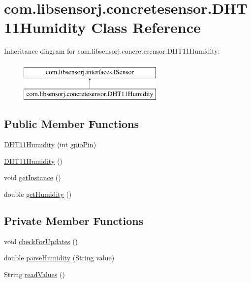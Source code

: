 \hypertarget{classcom_1_1libsensorj_1_1concretesensor_1_1DHT11Humidity}{}\section{com.\+libsensorj.\+concretesensor.\+D\+H\+T11\+Humidity Class Reference}
\label{classcom_1_1libsensorj_1_1concretesensor_1_1DHT11Humidity}
Inheritance diagram for com.\+libsensorj.\+concretesensor.\+D\+H\+T11\+Humidity\+:\begin{figure}[H]
\begin{center}
\leavevmode
\includegraphics[height=2.000000cm]{classcom_1_1libsensorj_1_1concretesensor_1_1DHT11Humidity}
\end{center}
\end{figure}
\subsection*{Public Member Functions}
\begin{DoxyCompactItemize}
\item 
\hyperlink{classcom_1_1libsensorj_1_1concretesensor_1_1DHT11Humidity_a86e81ac52b8c579b5025c33a8a64c360}{D\+H\+T11\+Humidity} (int \hyperlink{classcom_1_1libsensorj_1_1concretesensor_1_1DHT11Humidity_af27f27bf207dc6ef458fcf276657ac87}{gpio\+Pin})
\item 
\hyperlink{classcom_1_1libsensorj_1_1concretesensor_1_1DHT11Humidity_ad6a87900c7551436bfcc1dc319f16aea}{D\+H\+T11\+Humidity} ()
\item 
void \hyperlink{classcom_1_1libsensorj_1_1concretesensor_1_1DHT11Humidity_a2355dc003abad8d519440e9f6871c422}{get\+Instance} ()
\item 
double \hyperlink{classcom_1_1libsensorj_1_1concretesensor_1_1DHT11Humidity_a66ffb0fb3155c71e84298dd95aaf0ef8}{get\+Humidity} ()
\end{DoxyCompactItemize}
\subsection*{Private Member Functions}
\begin{DoxyCompactItemize}
\item 
void \hyperlink{classcom_1_1libsensorj_1_1concretesensor_1_1DHT11Humidity_a847ff0c615dff56ae8d5da3208c3ba03}{check\+For\+Updates} ()
\item 
double \hyperlink{classcom_1_1libsensorj_1_1concretesensor_1_1DHT11Humidity_a2eab8bb7fa064b72a28ac8fc3cc00378}{parse\+Humidity} (String value)
\item 
String \hyperlink{classcom_1_1libsensorj_1_1concretesensor_1_1DHT11Humidity_a121d9c798d12d6f0fa7cd1257ffa1edf}{read\+Values} ()
\end{DoxyCompactItemize}
